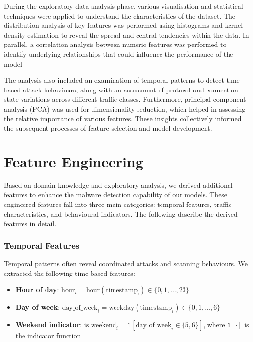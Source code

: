 During the exploratory data analysis phase, various visualisation and statistical techniques were applied to understand the characteristics of the dataset. The distribution analysis of key features was performed using histograms and kernel density estimation to reveal the spread and central tendencies within the data. In parallel, a correlation analysis between numeric features was performed to identify underlying relationships that could influence the performance of the model.

The analysis also included an examination of temporal patterns to detect time-based attack behaviours, along with an assessment of protocol and connection state variations across different traffic classes. Furthermore, principal component analysis (PCA) was used for dimensionality reduction, which helped in assessing the relative importance of various features. These insights collectively informed the subsequent processes of feature selection and model development.

\section{Feature Engineering}

Based on domain knowledge and exploratory analysis, we derived additional features to enhance the malware detection capability of our models. These engineered features fall into three main categories: temporal features, traffic characteristics, and behavioural indicators. The following describe the derived features in detail.

\subsubsection{Temporal Features}

Temporal patterns often reveal coordinated attacks and scanning behaviours. We extracted the following time-based features:

\begin{itemize}
    \item \textbf{Hour of day}: $\text{hour}_i = \text{hour}(\text{timestamp}_i) \in \{0,1,\ldots,23\}$
    
    \item \textbf{Day of week}: $\text{day\_of\_week}_i = \text{weekday}(\text{timestamp}_i) \in \{0,1,\ldots,6\}$
    
    \item \textbf{Weekend indicator}: $\text{is\_weekend}_i = \mathbb{1}[\text{day\_of\_week}_i \in \{5,6\}]$, where $\mathbb{1}[\cdot]$ is the indicator function
\end{itemize}

